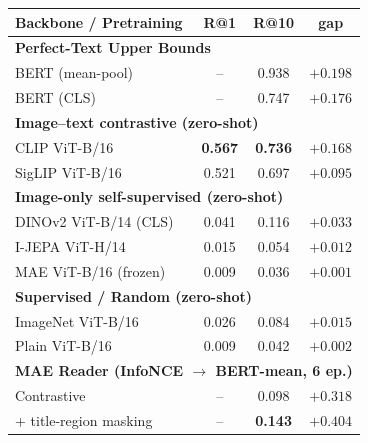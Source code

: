 \documentclass[varwidth,border=6pt]{standalone}
\begin{document}
\small
\begin{tabular}{lccc}
\toprule
Backbone / Pretraining & R@1 & R@10 & gap \\
\midrule
\multicolumn{4}{l}{\textbf{Perfect-Text Upper Bounds}} \\
BERT (mean-pool) & -- & 0.938 & $+0.198$ \\
BERT (CLS)       & -- & 0.747 & $+0.176$ \\
\midrule
\multicolumn{4}{l}{\textbf{Image--text contrastive (zero-shot)}} \\
\rowcolor{cITC} CLIP ViT-B/16   & \textbf{0.567} & \textbf{0.736} & $+0.168$ \\
\rowcolor{cITC} SigLIP ViT-B/16 & 0.521 & 0.697 & $+0.095$ \\
\midrule
\multicolumn{4}{l}{\textbf{Image-only self-supervised (zero-shot)}} \\
\rowcolor{cSSL} DINOv2 ViT-B/14 (CLS) & 0.041 & 0.116 & $+0.033$ \\
\rowcolor{cSSL} I-JEPA ViT-H/14       & 0.015 & 0.054 & $+0.012$ \\
\rowcolor{cSSL} MAE ViT-B/16 (frozen) & 0.009 & 0.036 & $+0.001$ \\
\midrule
\multicolumn{4}{l}{\textbf{Supervised / Random (zero-shot)}} \\
\rowcolor{cSUP} ImageNet ViT-B/16 & 0.026 & 0.084 & $+0.015$ \\
\rowcolor{cRND} Plain ViT-B/16    & 0.009 & 0.042 & $+0.002$ \\
\midrule
\multicolumn{4}{l}{\textbf{MAE Reader (InfoNCE $\to$ BERT-mean, 6 ep.)}} \\
\rowcolor{cFT} Contrastive            & -- & 0.098 & $+0.318$ \\
\rowcolor{cFT} + title-region masking & -- & \textbf{0.143} & $+0.404$ \\
\bottomrule
\end{tabular}
\end{document}
